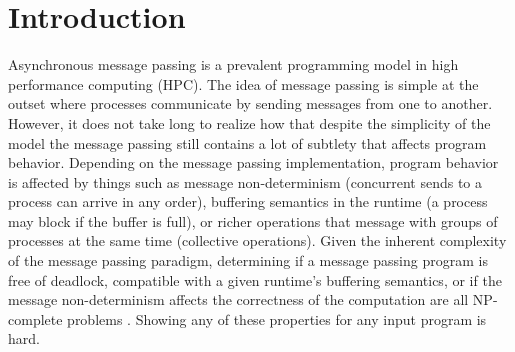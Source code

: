  \section{Introduction}
Asynchronous message passing is a prevalent programming model in high performance computing (HPC).
The idea of message passing is simple at the outset where processes communicate by sending messages from one to another. However, it does not take long to realize how that despite the simplicity of the model the message passing still contains a lot of subtlety that affects program behavior. Depending on the message passing implementation, program behavior is affected by things such as message non-determinism (concurrent sends to a process can arrive in any order), buffering semantics in the runtime (a process may block if the buffer is full), or richer operations that message with groups of processes at the same time (collective operations). Given the inherent complexity of the message passing paradigm, determining if a message passing program is free of deadlock, compatible with a given runtime’s buffering semantics, or if the message non-determinism affects the correctness of the computation are all NP-complete problems \cite{DBLP:conf/kbse/HuangMM13,HuangNFM15,HuangDeadlock}. Showing any of these properties for any input program is hard.

